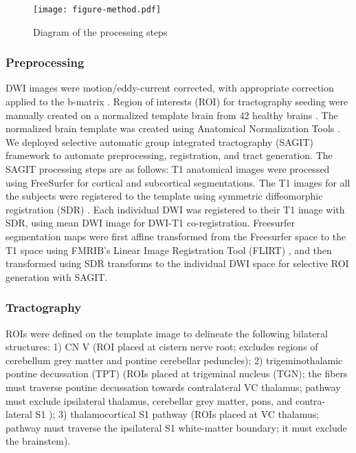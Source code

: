 \begin{figure}[ht]
\centering
\texttt{[image: figure-method.pdf]}
\caption{Diagram of the processing steps}
\label{fig:GPMethods}
\end{figure}

\subsubsection{Preprocessing}
DWI images were motion/eddy-current corrected, with appropriate correction applied to the b-matrix \cite{Leemans2009}. Region of interests (ROI) for tractography seeding were manually created on a normalized template brain from 42 healthy brains \cite{Chen2016}. The normalized brain template was created using Anatomical Normalization Tools \cite{Avants2010,Avants2011}. We deployed selective automatic group integrated tractography (SAGIT) framework \cite{Chen2016} to automate preprocessing, registration, and tract generation. The SAGIT processing steps are as follows: T1 anatomical images were processed using FreeSurfer \cite{Fischl2004} for cortical and subcortical segmentations. The T1 images for all the subjects were registered to the template using symmetric diffeomorphic registration (SDR) \cite{Avants2008b}. Each individual DWI was registered to their T1 image with SDR, using mean DWI image for DWI-T1 co-registration. Freesurfer segmentation maps were first affine transformed from the Freesurfer space to the T1 space using FMRIB's Linear Image Registration Tool (FLIRT) \cite{Jenkinson2001,Jenkinson2002}, and then transformed using SDR transforms to the individual DWI space for selective ROI generation with SAGIT.

\subsubsection{Tractography}
ROIs were defined on the template image to delineate the following bilateral structures: 1) CN V (ROI placed at cistern nerve root; excludes regions of cerebellum grey matter and pontine cerebellar peduncles); 2) trigeminothalamic pontine decussation (TPT) (ROIs placed at trigeminal nucleus (TGN); the fibers must traverse pontine decussation towards contralateral VC thalamus; pathway must exclude ipsilateral thalamus, cerebellar grey matter, pons, and contra-lateral S1 ); 3) thalamocortical S1 pathway (ROIs placed at VC thalamus; pathway must traverse the ipsilateral S1 white-matter boundary; it must exclude the brainstem).  

